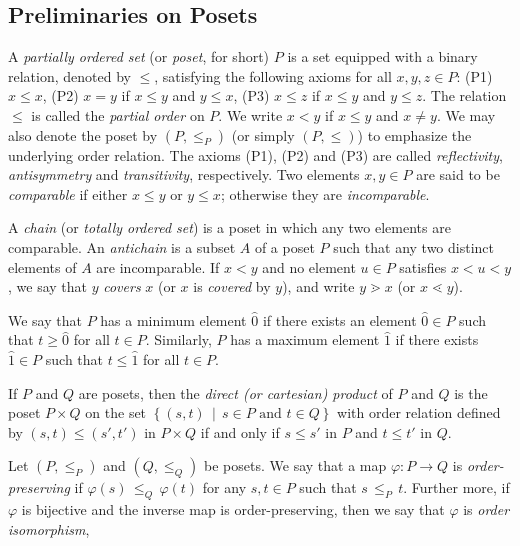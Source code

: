 \documentclass[a4paper,11pt]{amsart}
\theoremstyle{definition}
\numberwithin{equation}{section}
\begin{document}
\subsection{Preliminaries on Posets}\label{subsec:poset}
%
	A \textsl{partially ordered set} (or \textsl{poset}, for short) $P$ 
	is a set equipped with a binary relation, denoted by $\leq$,
	satisfying the following axioms for all $x, y, z \in P$:
		(P1)
		$x \leq x$,
		(P2)
		$x = y$ if $x \leq y$ and $y \leq x$,
		(P3)
		$x \leq z$ if $x \leq y$ and $y \leq z$.
	The relation $\leq$ is called the \textsl{partial order} on $P$.
	We write $x < y$
	if $x \leq y$ and $x \neq y$.
	We may also denote the poset by $(P, {\leq}_{P})$ (or simply $(P, \leq)$)
	to emphasize the underlying order relation.
	The axioms (P1), (P2) and (P3) are called 
	\textsl{reflectivity}, \textsl{antisymmetry} and \textsl{transitivity}, respectively.
Two elements $x,y \in P$ are said to be \textsl{comparable}
if either $x \leq y$ or $y \leq x$; otherwise they are \textsl{incomparable}.
%
\par
%
A \textsl{chain} (or \textsl{totally ordered set}) 
is a poset in which any two elements are comparable.
An \textsl{antichain} 
is a subset $A$ of a poset $P$ such that 
any two distinct elements of $A$ are incomparable.
%
If $x < y$ and no element $u \in P$ satisfies $x < u < y$,
we say that $y$ \textsl{covers} $x$ 
(or $x$ is \textsl{covered} by $y$), 
and write $y \gtrdot x$ (or $x \lessdot y$). 
%
\par
%
We say that $P$ has a minimum element $\hat0$ if there exists an element $\hat0\in P$ such that $t\geq\hat0$ for all $t\in P$.
Similarly, $P$ has a maximum element $\hat1$ if there exists $\hat1\in P$ such that $t\leq\hat1$ for all $t\in P$. 
%
\par
%
If $P$ and $Q$ are posets, 
then the \textsl{direct (or cartesian) product} of $P$ and $Q$ is the poset $P\times Q$
on the set $\left\{ (s,t) \,\middle|\, s\in P\text{ and } t \in Q\right\}$ 
with order relation defined by $(s,t) \leq (s',t')$ in $P\times Q$ if and only if $s \leq s'$ in $P$ and $t \leq t'$ in $Q$.
%
\par
%
Let $(P, {\leq}_{P})$ and $(Q, {\leq}_{Q})$ be posets.
We say that a map $\varphi \colon P \rightarrow Q$ is \textsl{order-preserving}
if $\varphi(s) \, {\leq}_{Q} \, \varphi(t)$
for any $s, t \in P$ such that $s \, {\leq}_{P} \, t$.
Further more, if $\varphi$ is bijective and the inverse map is order-preserving,
then we say that $\varphi$ is \textsl{order isomorphism},
\end{document}

